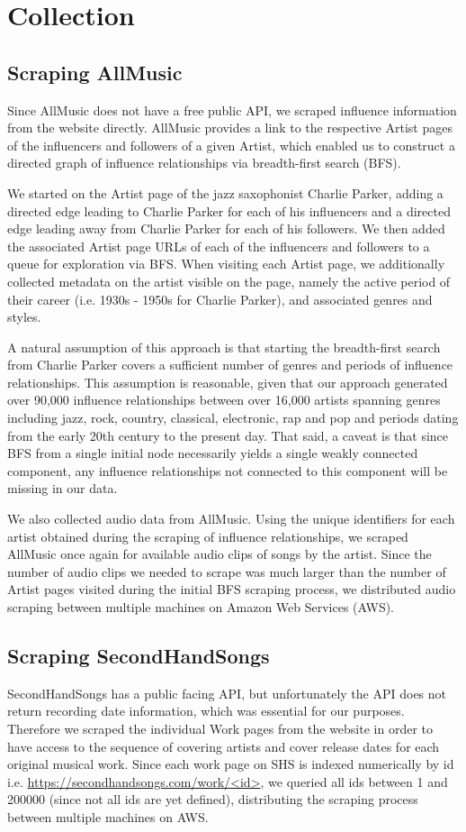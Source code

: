 \section{Collection}
\subsection*{Scraping AllMusic}
Since AllMusic does not have a free public API, we scraped influence information from the website directly. AllMusic provides a link to the respective Artist pages of the influencers and followers of a given Artist, which enabled us to construct a directed graph of influence relationships via breadth-first search (BFS). 

We started on the Artist page of the jazz saxophonist Charlie Parker, adding a directed edge leading to Charlie Parker for each of his influencers and a directed edge leading away from Charlie Parker for each of his followers. We then added the associated Artist page URLs of each of the influencers and followers to a queue for exploration via BFS. When visiting each Artist page, we additionally collected metadata on the artist visible on the page, namely the active period of their career (i.e. 1930s - 1950s for Charlie Parker), and associated genres and styles.

A natural assumption of this approach is that starting the breadth-first search from Charlie Parker covers a sufficient number of genres and periods of influence relationships. This assumption is reasonable, given that our approach generated over 90,000 influence relationships between over 16,000 artists spanning genres including jazz, rock, country, classical, electronic, rap and pop and periods dating from the early 20th century to the present day. That said, a caveat is that since BFS from a single initial node necessarily yields a single weakly connected component, any influence relationships not connected to this component will be missing in our data.

We also collected audio data from AllMusic. Using the unique identifiers for each artist obtained during the scraping of influence relationships, we scraped AllMusic once again for available audio clips of songs by the artist. Since the number of audio clips we needed to scrape was much larger than the number of Artist pages visited during the initial BFS scraping process, we distributed audio scraping between multiple machines on Amazon Web Services (AWS).

\subsection*{Scraping SecondHandSongs}
SecondHandSongs has a public facing API, but unfortunately the API does not return recording date information, which was essential for our purposes. Therefore we scraped the individual Work pages from the website in order to have access to the sequence of covering artists and cover release dates for each original musical work. Since each work page on SHS is indexed numerically by id i.e. \url{https://secondhandsongs.com/work/<id>}, we queried all ids between 1 and 200000 (since not all ids are yet defined), distributing the scraping process between multiple machines on AWS.

